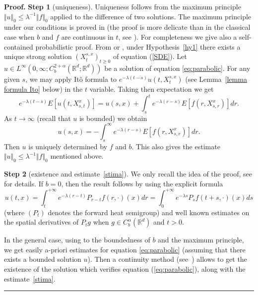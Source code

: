 \documentclass[a4paper,11pt]{article}
\newenvironment{proof}[1][Proof]{\textbf{#1.} }{\ \rule{0.5em}{0.5em}}
\begin{document}
\begin{proof}
\textbf{Step 1} (uniqueness). Uniqueness follows from the maximum principle $%
\Vert u\Vert _{0}\leq \lambda ^{-1}\Vert f\Vert _{0}$ applied to the
difference of two solutions. The maximum principle under our conditions is
proved in \cite[Theorem 4.1]{KP} (the proof is more delicate than in the
classical case when $b$ and $f$ are continuous in $t$, see \cite[Theorem 8.1.7]{Kr0}). For completeness we give also a self-contained probabilistic proof. From
\cite{V} or \cite{Kry-Ro}, under Hypothesis~\ref{hy1} there exists a unique
strong solution $(X_{t}^{s,x})_{t\ge 0}$ of equation (\ref{SDE}). Let $u\in L^{\infty
}\left( 0,\infty ;C_{b}^{2+\alpha }({\mathbb{R}}^{d};{\mathbb{R}}%
^{d})\right) $ be a solution of equation \eqref{eq:parabolic}. For any given $s$, we may apply
It\^{o} formula to $e^{-\lambda \left( t-s\right) }u\left(
t,X_{t}^{s,x}\right) $ (see Lemma~\ref{lemma formula Ito} below) in the $t$ variable. Taking then expectation we get
\begin{equation*}
e^{-\lambda \left( t-s\right) }E\left[ u\left( t,X_{s,t}^{x}\right) \right]
=u\left( s,x\right) +\int_{s}^{t}e^{-\lambda \left( r-s\right) }E\left[
f\left( r,X_{s,r}^{x}\right) \right] dr.
\end{equation*}
As $t\rightarrow \infty $ (recall that $u$ is bounded) we obtain
\begin{equation*}
u\left( s,x\right) =-\int_{s}^{\infty }e^{-\lambda \left( r-s\right) }E\left[
f\left( r,X_{s,r}^{x}\right) \right] dr.
\end{equation*}
Then $u$ is uniquely determined by $f$ and $b$. This also gives the estimate
$\Vert u\Vert _{0}\leq \lambda ^{-1}\Vert f\Vert _{0}$ mentioned above.

\textbf{Step 2} (existence and estimate~\eqref{stima}). We only recall the
idea of the proof, see \cite{KP} for details. If $b=0$, then the result
follows by using the explicit formula
\begin{equation}
u(t,x)=\int_{t}^{+\infty }e^{-\lambda (r-t)}P_{r-t}f(r,\cdot
)(x)dr=\int_{0}^{+\infty }e^{-\lambda s}P_{s}f(t+s,\cdot )(x)ds  \label{heat}
\end{equation}
(where $(P_{t})$ denotes the forward heat semigroup) and well known
estimates on the spatial derivatives of $P_{t}g$ when $g\in C_{b}^{\alpha
}\left( {\mathbb{R}}^{d}\right) $ and $t>0$.

In the general case, using to the boundedness of $b$ and the maximum
principle, we get easily a-priori estimates for equation \eqref{eq:parabolic}
(assuming that there exists a bounded solution $u$). Then a continuity
method (see~\cite[Lemma 4.3]{KP}) allows to get the existence of the
solution which verifies equation (\ref{eq:parabolic}), along with the estimate~\eqref{stima}.
\end{proof}
\end{document}
